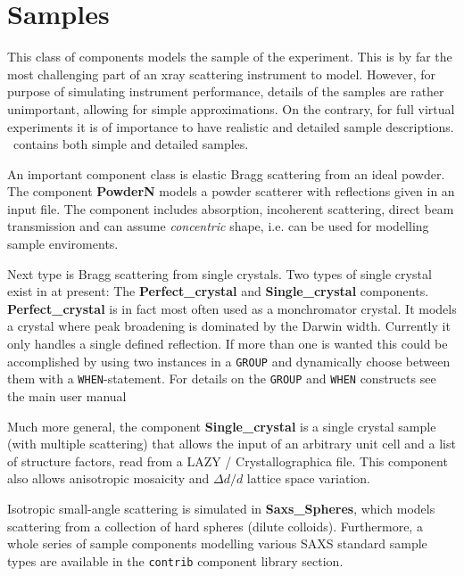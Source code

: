 \chapter{Samples}
\label{c:samples}

This class of components models the sample of the experiment.
This is by far the most challenging part of an xray scattering
instrument to model. However, for purpose of simulating
instrument performance, details of the samples are rather unimportant,
allowing for simple approximations. On the contrary, for full
virtual experiments it is of importance to have realistic and
detailed sample descriptions. \MCX\ contains both simple and detailed
samples.

An important component class is elastic Bragg scattering from an ideal powder.
The component \textbf{PowderN} models a powder scatterer with reflections
given in an input file. 
The component includes absorption, incoherent scattering, direct beam
transmission and can assume \emph{concentric} shape, i.e. can be used
for modelling sample enviroments.

Next type is Bragg scattering from single crystals. Two types of single crystal exist in \MCX
at present: The \textbf{Perfect\_crystal} and \textbf{Single\_crystal} components.
\textbf{Perfect\_crystal} is in fact most often used as a monchromator crystal. It models a 
crystal where peak broadening is dominated by the Darwin width. Currently it only handles a
single defined reflection. If more than one is wanted this could be
accomplished by using two instances in a \texttt{GROUP} and dynamically choose between
them with a \texttt{WHEN}-statement. For details on the \texttt{GROUP} and \texttt{WHEN} constructs see the
main \MCX user manual~\cite{mcxtracemanual}

Much more general, the component \textbf{Single\_crystal}
is a single crystal sample (with multiple scattering) that allows
the input of an arbitrary unit cell and a list of structure factors, read
from a LAZY / Crystallographica file.
This component also allows anisotropic mosaicity
and $\Delta d/d$ lattice space variation.

Isotropic small-angle scattering is simulated in \textbf{Saxs\_Spheres},
which models scattering from a collection of hard spheres (dilute colloids).
Furthermore, a whole series of sample components modelling various SAXS standard 
sample types are available in the  \texttt{contrib} component library section.

